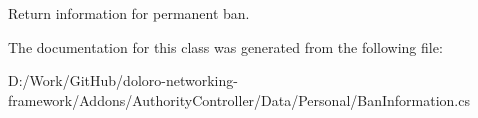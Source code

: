 Return information for permanent ban. 



The documentation for this class was generated from the following file\+:\begin{DoxyCompactItemize}
\item 
D\+:/\+Work/\+Git\+Hub/doloro-\/networking-\/framework/\+Addons/\+Authority\+Controller/\+Data/\+Personal/Ban\+Information.\+cs\end{DoxyCompactItemize}
